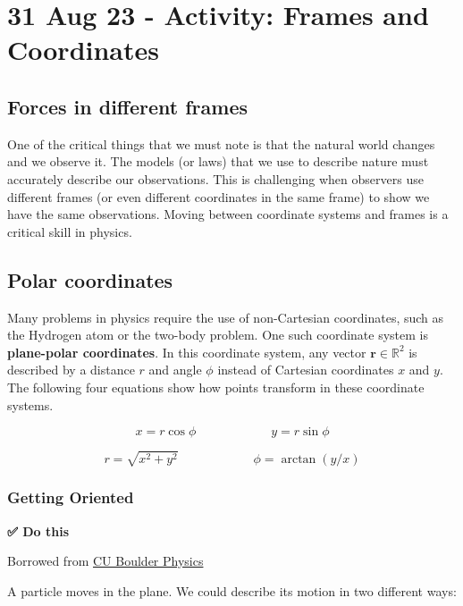 \section{31 Aug 23 - Activity: Frames and
Coordinates}\label{aug-23---activity-frames-and-coordinates}

\subsection{Forces in different
frames}\label{forces-in-different-frames}

One of the critical things that we must note is that the natural world
changes and we observe it. The models (or laws) that we use to describe
nature must accurately describe our observations. This is challenging
when observers use different frames (or even different coordinates in
the same frame) to show we have the same observations. Moving between
coordinate systems and frames is a critical skill in physics.

\subsection{Polar coordinates}\label{polar-coordinates}

Many problems in physics require the use of non-Cartesian coordinates,
such as the Hydrogen atom or the two-body problem. One such coordinate
system is \textbf{plane-polar coordinates}. In this coordinate system,
any vector \(\mathbf{r}\in \mathbb{R}^2\) is described by a distance
\(r\) and angle \(\phi\) instead of Cartesian coordinates \(x\) and
\(y\). The following four equations show how points transform in these
coordinate systems.

\[
x = r\cos \phi \hspace{1in} y = r\sin \phi
\]

\[
r = \sqrt{x^2 + y^2} \hspace{1in} \phi = \arctan(y / x)
\]

\subsubsection{Getting Oriented}\label{getting-oriented}

\textbf{✅ Do this}

Borrowed from
\href{https://physicscourses.colorado.edu/EducationIssues/ClassicalMechanics/}{CU
Boulder Physics}

A particle moves in the plane. We could describe its motion in two
different ways:

